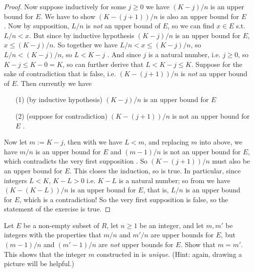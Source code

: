 \begin{proof}
Now suppose inductively for some \(j \ge 0\) we have \((K - j)/n\) is an upper bound for \(E\).
We have to show \((K - (j + 1))/n\) is also an upper bound for \(E\) .
Now by supposition, \(L/n\) is \emph{not} an upper bound of \(E\), so we can find \(x \in E\) s.t. \(L/n < x\).
But since by inductive hypothesis \((K - j)/n\) is an upper bound for \(E\), \(x \le (K - j)/n\).
So together we have \(L/n < x \le (K - j)/n\), so \(L/n < (K - j)/n\), so \(L < K - j\) .
And since \(j\) is a natural number, i.e. \(j \ge 0\), so \(K - j \le K - 0 = K\), so can further derive that \(L < K - j \le K\).
Suppose for the sake of contradiction that  is false, i.e. \((K - (j + 1))/n\) is \emph{not} an upper bound of \(E\).
Then currently we have
\begin{enumerate}
    \item[(1)] (by inductive hypothesis) \((K - j)/n\) is an upper bound for \(E\)
    \item[(2)] (suppose for contradiction) \((K - (j + 1))/n\) is not an upper bound for \(E\) .
\end{enumerate}
Now let \(m := K - j\), then with  we have \(L < m\),
and replacing \(m\) into above, we have \(m/n\) is an upper bound for \(E\) and \((m - 1)/n\) is not an upper bound for \(E\), which contradicts the very first supposition .
So \((K - (j + 1))/n\) must also be an upper bound for \(E\).
This closes the induction, so  is true.
In particular, since integers \(L < K\), \(K - L > 0\) i.e. \(K - L\) is a natural number;
so from  we have \((K - (K - L))/n\) is an upper bound for \(E\), that is, \(L/n\) is an upper bound for \(E\), which is a contradiction!
So the very first supposition  is false, so the statement of the exercise is true.
\end{proof}

\begin{exercise} \label{exercise 5.5.3}
Let \(E\) be a non-empty subset of \(R\), let \(n \ge 1\) be an integer, and let \(m, m'\) be integers with the properties that \(m/n\) and \(m'/n\) are upper bounds for \(E\), but \((m - 1)/n\) and \((m' - 1)/n\) are \emph{not} upper bounds for \(E\).
Show that \(m = m'\).
This shows that the integer \(m\) constructed in  is \emph{unique}.
(Hint: again, drawing a picture will be helpful.)
\end{exercise}

